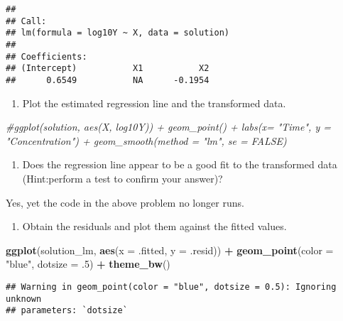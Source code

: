 \documentclass[
]{article}
\newenvironment{Shaded}{\begin{snugshade}}{\end{snugshade}}
\newcommand{\AttributeTok}[1]{\textcolor[rgb]{0.13,0.29,0.53}{#1}}
\newcommand{\CommentTok}[1]{\textcolor[rgb]{0.56,0.35,0.01}{\textit{#1}}}
\newcommand{\DecValTok}[1]{\textcolor[rgb]{0.00,0.00,0.81}{#1}}
\newcommand{\FunctionTok}[1]{\textcolor[rgb]{0.13,0.29,0.53}{\textbf{#1}}}
\newcommand{\NormalTok}[1]{#1}
\newcommand{\SpecialCharTok}[1]{\textcolor[rgb]{0.81,0.36,0.00}{\textbf{#1}}}
\newcommand{\StringTok}[1]{\textcolor[rgb]{0.31,0.60,0.02}{#1}}
\providecommand{\tightlist}{%
  \setlength{\itemsep}{0pt}\setlength{\parskip}{0pt}}
\begin{document}
\begin{verbatim}
## 
## Call:
## lm(formula = log10Y ~ X, data = solution)
## 
## Coefficients:
## (Intercept)           X1           X2  
##      0.6549           NA      -0.1954
\end{verbatim}

\begin{enumerate}
\def\labelenumi{(\alph{enumi})}
\setcounter{enumi}{3}
\tightlist
\item
  Plot the estimated regression line and the transformed data.
\end{enumerate}

\begin{Shaded}
\begin{Highlighting}[]
\CommentTok{\#ggplot(solution, aes(X, log10Y)) + geom\_point() + labs(x= "Time", y = "Concentration") + geom\_smooth(method = "lm", se = FALSE)}
\end{Highlighting}
\end{Shaded}

\begin{enumerate}
\def\labelenumi{(\alph{enumi})}
\setcounter{enumi}{4}
\tightlist
\item
  Does the regression line appear to be a good fit to the transformed
  data (Hint:perform a test to confirm your answer)?
\end{enumerate}

Yes, yet the code in the above problem no longer runs.

\begin{enumerate}
\def\labelenumi{(\alph{enumi})}
\setcounter{enumi}{5}
\tightlist
\item
  Obtain the residuals and plot them against the fitted values.
\end{enumerate}

\begin{Shaded}
\begin{Highlighting}[]
\FunctionTok{ggplot}\NormalTok{(solution\_lm, }\FunctionTok{aes}\NormalTok{(}\AttributeTok{x =}\NormalTok{ .fitted, }\AttributeTok{y =}\NormalTok{ .resid)) }\SpecialCharTok{+} \FunctionTok{geom\_point}\NormalTok{(}\AttributeTok{color =} \StringTok{"blue"}\NormalTok{, }\AttributeTok{dotsize =}\NormalTok{ .}\DecValTok{5}\NormalTok{) }\SpecialCharTok{+} \FunctionTok{theme\_bw}\NormalTok{()}
\end{Highlighting}
\end{Shaded}

\begin{verbatim}
## Warning in geom_point(color = "blue", dotsize = 0.5): Ignoring unknown
## parameters: `dotsize`
\end{verbatim}
\end{document}
